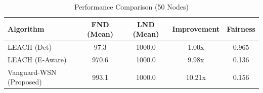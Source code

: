 \begin{table}[h]
\centering
\caption{Performance Comparison (50 Nodes)}
\begin{tabular}{|l|c|c|c|c|}
\hline
\textbf{Algorithm} & \textbf{FND (Mean)} & \textbf{LND (Mean)} & \textbf{Improvement} & \textbf{Fairness} \\ \hline
LEACH (Det) & 97.3 & 1000.0 & 1.00x & 0.965 \\ 
LEACH (E-Aware) & 970.6 & 1000.0 & 9.98x & 0.136 \\ 
Vanguard-WSN (Proposed) & 993.1 & 1000.0 & 10.21x & 0.156 \\ 
 \hline 
\end{tabular}
\end{table}